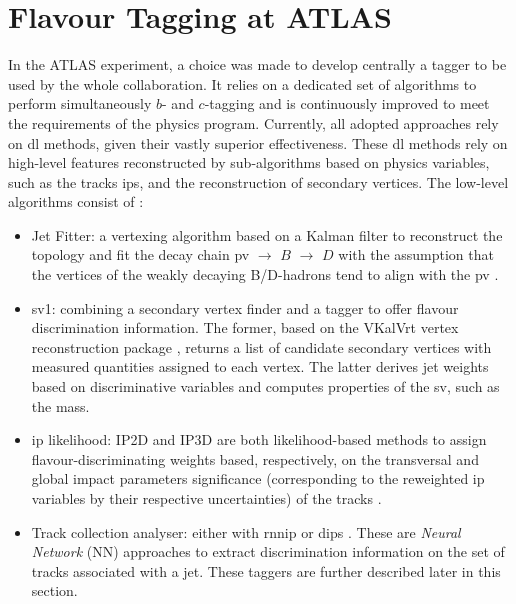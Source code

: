 \section{Flavour Tagging at ATLAS}

In the ATLAS experiment, a choice was made to develop centrally a tagger to be used by the whole collaboration. It relies on a dedicated set of algorithms to perform simultaneously $b$- and $c$-tagging and is continuously improved to meet the requirements of the physics program. Currently, all adopted approaches rely on \gls{dl} methods, given their vastly superior effectiveness. These \gls{dl} methods rely on high-level features reconstructed by sub-algorithms based on physics variables, such as the tracks \glspl{ip}, and the reconstruction of secondary vertices. The low-level algorithms consist of \cite{Paganini:2289214}:
\begin{itemize}
\item Jet Fitter: a vertexing algorithm based on a Kalman filter to reconstruct the topology and fit the decay chain \gls{pv} $\rightarrow$ $B$ $\rightarrow$ $D$ with the assumption that the vertices of the weakly decaying B/D-hadrons tend to align with the \gls{pv} \cite{ATL-PHYS-PUB-2018-025}. 
\item \gls{sv1}: combining a secondary vertex finder and a tagger to offer flavour discrimination information. The former, based on the VKalVrt vertex reconstruction package \cite{Kostyukhin:685551}, returns a list of candidate secondary vertices with measured quantities assigned to each vertex. The latter derives jet weights based on discriminative variables and computes properties of the \gls{sv}, such as the mass. 
\item \gls{ip} likelihood: IP2D and IP3D are both likelihood-based methods to assign flavour-discriminating weights based, respectively, on the transversal and global impact parameters significance (corresponding to the reweighted \gls{ip} variables by their respective uncertainties) of the tracks \cite{ATLAS:2017bcq}. 
\item Track collection analyser: either with \gls{rnnip} \cite{ATL-PHYS-PUB-2017-003} or \gls{dips} \cite{ATL-PHYS-PUB-2020-014}. These are \textit{Neural Network} (NN) approaches to extract discrimination information on the set of tracks associated with a jet. These taggers are further described later in this section.  
\end{itemize}

